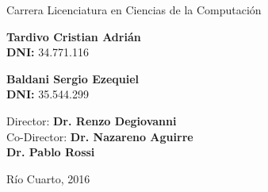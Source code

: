 \documentclass[12pt]{report}
\begin{document}
\begin{titlepage}
\begin{center}
{			Carrera Licenciatura en Ciencias de la Computaci\'on \vspace{0.5cm}}
			
			{\large \textbf{Tardivo Cristian Adri\'an \\ DNI:} 34.771.116}\vspace{0cm}
			
			{\large \textbf{Baldani Sergio Ezequiel \\ DNI:} 35.544.299}\vspace{0.5cm}
			
			{
				\large Director: \textbf{Dr. Renzo Degiovanni}\\
				\vspace{0,25cm}
				Co-Director: \textbf{Dr. Nazareno Aguirre}\\
				             \hspace{1.6cm}\textbf{Dr. Pablo Rossi}
			}
            \vspace{0,5cm}
			
			{\large R\'io Cuarto, 2016}
			\end{center}
	\end{titlepage}



\setcounter{tocdepth}{4}
\setcounter{secnumdepth}{4}
\setlength{\cftbeforetoctitleskip}{-2.5em}
\tableofcontents






\end{document}
